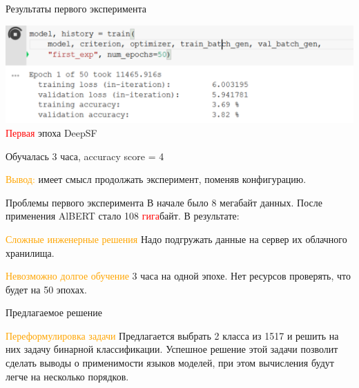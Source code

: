 \documentclass{beamer}
\begin{document}
 

\begin{frame}{Результаты первого эксперимента }

\includegraphics[width=1.0\textwidth]{figures/figure5.pdf}
    \textcolor{red}{Первая} эпоха DeepSF
    
\bigskip

Обучалась 3 часа, accuracy score = 4%

\bigskip

\textcolor{orange}{Вывод:} имеет смысл продолжать эксперимент, поменяв конфигурацию.
\end{frame}


\begin{frame}{Проблемы первого эксперимента}
 В начале было 8 мегабайт данных. После применения AlBERT стало 108 \textcolor{red}{гига}байт. В результате: 
\begin{block}{\textcolor{orange}{Сложные инженерные решения}}
Надо подгружать данные на сервер их облачного хранилища. 
\end{block}
\begin{block}{\textcolor{orange}{Невозможно долгое обучение}}
3 часа на одной эпохе. Нет ресурсов проверять, что будет на 50 эпохах.
\end{block}
\end{frame}

\begin{frame}{Предлагаемое решение}
\begin{block}{\textcolor{orange}{Переформулировка задачи}}
Предлагается выбрать 2 класса из 1517 и решить на них задачу бинарной классификации. Успешное решение этой задачи позволит сделать выводы о применимости языков моделей, при этом вычисления будут легче на несколько порядков. 
\end{block}

\end{frame}

\end{document}
